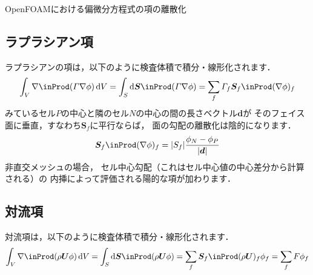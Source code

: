 \begin{table}[ht]
 
 \caption{OpenFOAMにおける偏微分方程式の項の離散化}
 \label{tbl:2.2}
\end{table}


\subsection{ラプラシアン項}
\label{ssec:2.4.1}
ラプラシアンの項は，以下のように検査体積で積分・線形化されます．
\begin{align}
 \label{eq:2.14}
 \int_{V}\nabla \inProd (\varGamma\nabla\phi)\,\mathrm{d}V
 = \int_{S}\mathrm{d}\bm{S} \inProd (\varGamma\nabla\phi)
 = \sum_{f}\varGamma_{f}\bm{S}_{f} \inProd (\nabla\phi)_{f}
\end{align}
みているセル$P$の中心と隣のセル$N$の中心の間の長さベクトル$\bm{d}$が
そのフェイス面に垂直，すなわち$\bm{S}_{f}$に平行ならば，
面の勾配の離散化は陰的になります．
\begin{align}
 \label{eq:2.15}
 \bm{S}_{f} \inProd (\nabla\phi)_{f}
 = |S_{f}|\frac{\phi_{N} - \phi_{P}}{|\bm{d}|}
\end{align}
非直交メッシュの場合，
セル中心勾配（これはセル中心値の中心差分から計算される）の
内挿によって評価される陽的な項が加わります．


\subsection{対流項}
\label{ssec:2.4.2}
対流項は，以下のように検査体積で積分・線形化されます．
\begin{align}
 \label{eq:2.16}
 \int_{V}\nabla \inProd (\rho\bm{U}\phi)\,\mathrm{d}V
 = \int_{S}\mathrm{d}\bm{S} \inProd (\rho\bm{U}\phi)
 = \sum_{f}\bm{S}_{f} \inProd (\rho\bm{U})_{f}\phi_{f}
 = \sum_{f}F\phi_{f}
\end{align}

